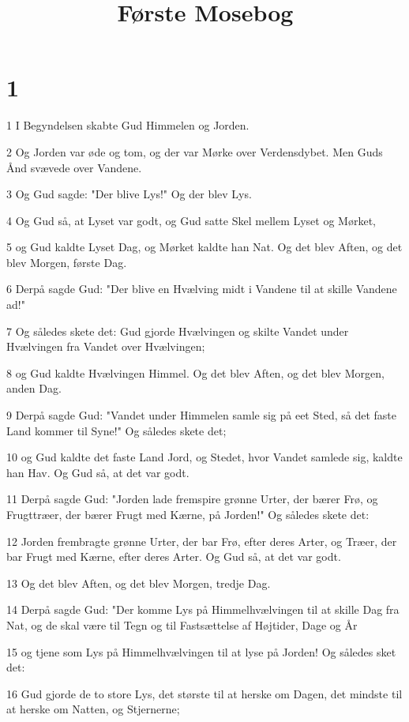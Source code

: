 

\title{Første Mosebog}



\chapter{1}

\par 1 I Begyndelsen skabte Gud Himmelen og Jorden.
\par 2 Og Jorden var øde og tom, og der var Mørke over Verdensdybet. Men Guds Ånd svævede over Vandene.
\par 3 Og Gud sagde: "Der blive Lys!" Og der blev Lys.
\par 4 Og Gud så, at Lyset var godt, og Gud satte Skel mellem Lyset og Mørket,
\par 5 og Gud kaldte Lyset Dag, og Mørket kaldte han Nat. Og det blev Aften, og det blev Morgen, første Dag.
\par 6 Derpå sagde Gud: "Der blive en Hvælving midt i Vandene til at skille Vandene ad!"
\par 7 Og således skete det: Gud gjorde Hvælvingen og skilte Vandet under Hvælvingen fra Vandet over Hvælvingen;
\par 8 og Gud kaldte Hvælvingen Himmel. Og det blev Aften, og det blev Morgen, anden Dag.
\par 9 Derpå sagde Gud: "Vandet under Himmelen samle sig på eet Sted, så det faste Land kommer til Syne!" Og således skete det;
\par 10 og Gud kaldte det faste Land Jord, og Stedet, hvor Vandet samlede sig, kaldte han Hav. Og Gud så, at det var godt.
\par 11 Derpå sagde Gud: "Jorden lade fremspire grønne Urter, der bærer Frø, og Frugttræer, der bærer Frugt med Kærne, på Jorden!" Og således skete det:
\par 12 Jorden frembragte grønne Urter, der bar Frø, efter deres Arter, og Træer, der bar Frugt med Kærne, efter deres Arter. Og Gud så, at det var godt.
\par 13 Og det blev Aften, og det blev Morgen, tredje Dag.
\par 14 Derpå sagde Gud: "Der komme Lys på Himmelhvælvingen til at skille Dag fra Nat, og de skal være til Tegn og til Fastsættelse af Højtider, Dage og År
\par 15 og tjene som Lys på Himmelhvælvingen til at lyse på Jorden! Og således sket det:
\par 16 Gud gjorde de to store Lys, det største til at herske om Dagen, det mindste til at herske om Natten, og Stjernerne;
